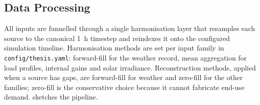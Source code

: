\subsection{Data Processing}
\label{sec:dataProcessing}
 
All inputs are funnelled through a single harmonisation layer that resamples each source to the canonical \SI{1}{h} timestep and reindexes it onto the configured simulation timeline. Harmonisation methods are set per input family in \texttt{config/thesis.yaml}: forward-fill for the weather record, mean aggregation for load profiles, internal gains and solar irradiance. Reconstruction methods, applied when a source has gaps, are forward-fill for weather and zero-fill for the other families; zero-fill is the conservative choice because it cannot fabricate end-use demand.  sketches the pipeline.

